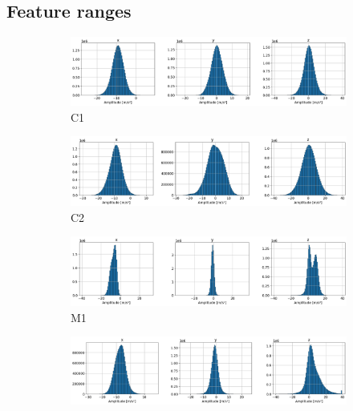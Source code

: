 \subsection{Feature ranges}
\begin{figure}[h]
    \centering
    \begin{subfigure}[b]{0.33\textwidth}
        \includegraphics[width=\textwidth]{assets/results/histograms/C1.png}
        \caption{C1}
    \end{subfigure}
    \hfill
    \begin{subfigure}[b]{0.33\textwidth}
        \includegraphics[width=\textwidth]{assets/results/histograms/C2.png}
        \caption{C2}
    \end{subfigure}
    \hfill
    \begin{subfigure}[b]{0.33\textwidth}
        \includegraphics[width=\textwidth]{assets/results/histograms/M1.png}
        \caption{M1}
    \end{subfigure}
    \hfill
    \begin{subfigure}[b]{0.33\textwidth}
        \includegraphics[width=\textwidth]{assets/results/histograms/M2.png}

\end{subfigure}
\end{figure}
